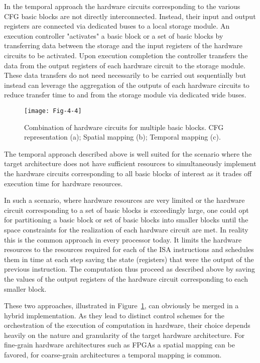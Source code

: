 In the temporal approach the hardware circuits corresponding to the various CFG basic blocks are not directly interconnected. 
Instead, their input and output registers are connected via dedicated buses to a local storage module. 
An execution controller "activates" a basic block or a set of basic blocks by transferring data between the storage and the input registers of the hardware circuits to be activated. 
Upon execution completion the controller transfers the data from the output registers of each hardware circuit to the storage module. 
These data transfers do not need necessarily to be carried out sequentially but instead can leverage the aggregation of the outputs of each hardware circuits to reduce transfer time to and from the storage module via dedicated wide buses.

\begin{figure}[htbp]
  \centering

\texttt{[image: Fig-4-4]}
\caption{Combination of hardware circuits for multiple basic blocks. 
CFG representation (a); Spatial mapping (b); Temporal mapping (c).}
\label{fig:Fig.4.4}
\end{figure}

The temporal approach described above is well suited for the scenario where the target architecture does not have sufficient resources to simultaneously implement the hardware circuits corresponding to all basic blocks of interest as it trades off execution time for hardware resources.

In such a scenario, where hardware resources are very limited or the hardware circuit corresponding to a set of basic blocks is exceedingly large, one could opt for partitioning a basic block or set of basic blocks into smaller blocks until the space constraints for the realization of each hardware circuit are met. 
In reality this is the common approach in every processor today. 
It limits the hardware resources to the resources required for each of the ISA instructions and schedules them in time at each step saving the state (registers) that were the output of the previous instruction. 
The computation thus proceed as described above by saving the values of the output registers of the hardware circuit corresponding to each smaller block.

These two approaches, illustrated in Figure~\ref{fig:Fig.4.4}, can obviously be merged in a hybrid implementation. 
As they lead to distinct control schemes for the orchestration of the execution of computation in hardware, their choice depends heavily on the nature and granularity of the target hardware architecture. 
For fine-grain hardware architectures such as FPGAs a spatial mapping can be favored, for coarse-grain architectures a temporal mapping is common.


